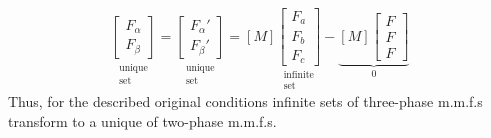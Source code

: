 \documentclass[a4paper,numbers=noenddot,12pt]{scrbook}
\begin{document}
    \begin{equation}
        \underset{\substack{\text{unique} \\ \text{set}}}
        {\begin{bmatrix}
            F_{\alpha} \\ F_{\beta}
        \end{bmatrix}}
        =
        \underset{\substack{\text{unique} \\ \text{set}}}
        {\begin{bmatrix}
            F_{\alpha}' \\ F_{\beta}'
        \end{bmatrix}}
        = [M]
        \underset{\substack{\text{infinite} \\ \text{set}}}
        {\begin{bmatrix}
            F_a \\ F_b \\ F_c
        \end{bmatrix}}
        -
        \underbrace
        {[M]
            \begin{bmatrix}
                F \\ F \\ F
            \end{bmatrix}}_{0}
            \label{eq:Eq7.9}
        \end{equation}
        Thus, for the described original conditions infinite sets of three-phase m.m.f.s transform to a unique of two-phase m.m.f.s.
\end{document}

